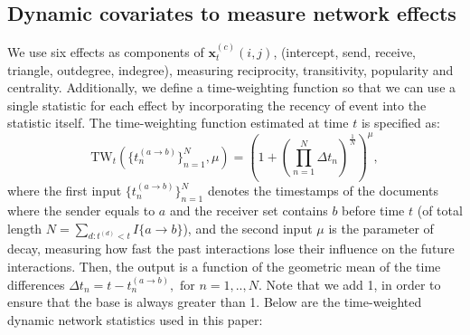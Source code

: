 \documentclass[a4paper]{article}
\begin{document}
 \subsection{Dynamic covariates to measure network effects} \label{subsec: Dynamic covariates}
\iffalse
The network statistics $\boldsymbol{x}^{(c)}_t(i, j)$ of Equation (3), corresponding to the ordered pair $(i, j)$, can be time-invariant (such as gender) or time-dependent (such as the number of two-paths from $i$ to $j$ just before time $t$). There could be various static and dynamic covariates $\boldsymbol{x}^{(c)}_t(i, j)$ that affects the stochastic intensity, however, we decide to use the covariates that depend on the history of the process, considering the strong recency and reciprocity effects of textual communications, especially emails.\fi
 We use six effects as components of $\boldsymbol{x}^{(c)}_t(i, j)$, (intercept, send, receive, triangle, outdegree, indegree), measuring reciprocity, transitivity, popularity and centrality. Additionally, we define a time-weighting function so that we can use a single statistic for each effect by incorporating the recency of event into the statistic itself. The time-weighting function estimated at time $t$ is specified as:
 \begin{equation}
 \mbox{TW}_t(\{t_n^{(a\rightarrow b)}\}_{n=1}^N, \mu) = (1+(\prod\limits_{n=1}^N\Delta t_n)^{\frac{1}{N}})^\mu,
 \end{equation}
 where the first input $\{t_n^{(a\rightarrow b)}\}_{n=1}^N$ denotes the timestamps of the documents where the sender equals to $a$ and the receiver set contains $b$ before time $t$ (of total length $N = \sum_{d: t^{(d)}<t} I\{a\rightarrow b\}$), and the second input $\mu$ is the parameter of decay, measuring how fast the past interactions lose their influence on the future interactions. Then, the output is a function of the geometric mean of the time differences $\Delta t_n=t-t_n^{(a\rightarrow b)}, \mbox{ for } n=1,..,N$. Note that we add 1, in order to ensure that the base is always greater than 1. Below are the time-weighted dynamic network statistics used in this paper:\\
\end{document}
